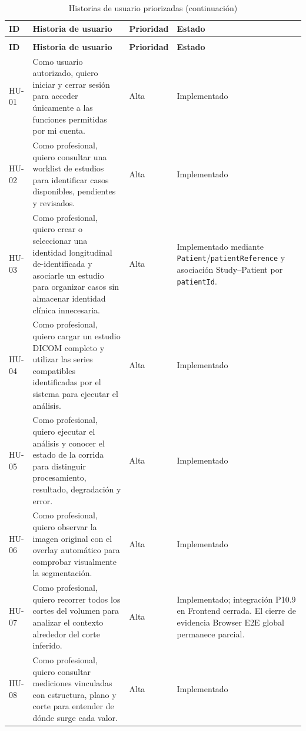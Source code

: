 {\footnotesize
\setlength{\LTleft}{0pt}
\setlength{\LTright}{0pt}
\setlength{\tabcolsep}{2pt}
\renewcommand{\arraystretch}{1.18}
\begin{longtable}{>{\raggedright\arraybackslash}p{} >{\raggedright\arraybackslash}p{} >{\raggedright\arraybackslash}p{} >{\raggedright\arraybackslash}p{}}
\caption{Historias de usuario priorizadas}\label{tab:req-historias-usuario}\\
\hline
\textbf{ID} & \textbf{Historia de usuario} & \textbf{Prioridad} & \textbf{Estado} \\
\hline
\endfirsthead
\caption[]{Historias de usuario priorizadas (continuación)}\\
\hline
\textbf{ID} & \textbf{Historia de usuario} & \textbf{Prioridad} & \textbf{Estado} \\
\hline
\endhead
\hline
\endfoot
HU-01 & Como usuario autorizado, quiero iniciar y cerrar sesión para acceder únicamente a las funciones permitidas por mi cuenta. & Alta & Implementado \\
HU-02 & Como profesional, quiero consultar una worklist de estudios para identificar casos disponibles, pendientes y revisados. & Alta & Implementado \\
HU-03 & Como profesional, quiero crear o seleccionar una identidad longitudinal de-identificada y asociarle un estudio para organizar casos sin almacenar identidad clínica innecesaria. & Alta & Implementado mediante \texttt{Patient}/\texttt{patientReference} y asociación Study--Patient por \texttt{patientId}. \\
HU-04 & Como profesional, quiero cargar un estudio DICOM completo y utilizar las series compatibles identificadas por el sistema para ejecutar el análisis. & Alta & Implementado \\
HU-05 & Como profesional, quiero ejecutar el análisis y conocer el estado de la corrida para distinguir procesamiento, resultado, degradación y error. & Alta & Implementado \\
HU-06 & Como profesional, quiero observar la imagen original con el overlay automático para comprobar visualmente la segmentación. & Alta & Implementado \\
HU-07 & Como profesional, quiero recorrer todos los cortes del volumen para analizar el contexto alrededor del corte inferido. & Alta & Implementado; integración P10.9 en Frontend cerrada. El cierre de evidencia Browser E2E global permanece parcial. \\
HU-08 & Como profesional, quiero consultar mediciones vinculadas con estructura, plano y corte para entender de dónde surge cada valor. & Alta & Implementado \\

\end{longtable}}
